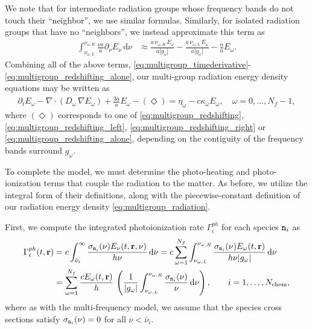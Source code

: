 \documentclass[10pt]{article}
\renewcommand{\(}{\left(}
\renewcommand{\)}{\right)}
\newcommand{\rvec}{{\bf r}}
\newcommand{\adot}{\dot{a}}
\newcommand{\Enu}{E_{\nu}}
\newcommand{\mn}{{\tt n}}
\begin{document}
We note that for intermediate radiation groups whose frequency bands
do not touch their ``neighbor'', we use similar formulas.  Similarly,
for isolated radiation groups that have no ``neighbors'', we instead
approximate this term as 
\begin{align}
 \label{eq:multigroup_redshifting_alone}
   \int_{\nu_{\omega,L}}^{\nu_{\omega,R}}
   \frac{\nu \adot}{a}\partial_{\nu}\Enu\,\mathrm d\nu 
   &\approx
   \frac{\adot\, \nu_{\omega,R}\, E_{\omega}}{a|g_{\omega}|} -
   \frac{\adot\, \nu_{\omega,L}\, E_{\omega}}{a|g_{\omega}|} - 
   \frac{\adot}{a}E_{\omega}.
\end{align}
Combining all of the above terms,
\eqref{eq:multigroup_timederivative}-\eqref{eq:multigroup_redshifting_alone},
our multi-group radiation energy density equations may be written as
\begin{align}
  \label{eq:mgfld_multigroup}
  \partial_{t} E_{\omega} - \nabla\cdot(D_{\omega}\,\nabla E_{\omega}) 
      + \frac{3 \adot}{a} E_{\omega} - (\Diamond)
    = \eta_{\omega} - c \kappa_{\omega} E_{\omega},\quad \omega=0,\ldots,N_f-1,
\end{align}
where $(\Diamond)$ corresponds to one of
\eqref{eq:multigroup_redshifting},
\eqref{eq:multigroup_redshifting_left},
\eqref{eq:multigroup_redshifting_right} or
\eqref{eq:multigroup_redshifting_alone}, depending on the contiguity
of the frequency bands surround $g_\omega$. 

To complete the model, we must determine the photo-heating and
photo-ionization terms that couple the radiation to the matter.  As
before, we utilize the integral form of their definitions, along with
the piecewise-constant definition of our radiation energy density
\eqref{eq:multigroup_radiation}.  

First, we compute the integrated photoionization rate $\Gamma_i^{ph}$
for each species $\mn_i$ as 
\begin{align}
\label{eq:multigroup_photoionization}
   \Gamma_i^{ph}(t,\rvec)  &= 
   c \int_{\bar{\nu}_i}^{\infty} \frac{\sigma_{\mn_i}(\nu)\Enu(t,\rvec,\nu)}{h\nu}\,\mathrm d\nu =  
   c \sum_{\omega=1}^{N_f} \int_{\nu_{\omega,L}}^{\nu_{\omega,R}} \frac{\sigma_{\mn_i}(\nu) E_{\omega}(t,\rvec)}{h\nu|g_{\omega}|}\,\mathrm d\nu \\
\notag
   &= \sum_{\omega=1}^{N_f} \frac{c E_{\omega}(t,\rvec)}{h}\,
   \left(\frac{1}{|g_{\omega}|} 
     \int_{\nu_{\omega,L}}^{\nu_{\omega,R}} \frac{\sigma_{\mn_i}(\nu)}{\nu}\,\mathrm d\nu\right), 
   \qquad i=1,\ldots,N_\text{chem},
\end{align}
where as with the multi-frequency model, we assume that the species
cross sections satisfy $\sigma_{\mn_i}(\nu) = 0$ for all $\nu <
\bar{\nu}_i$.
\end{document}
